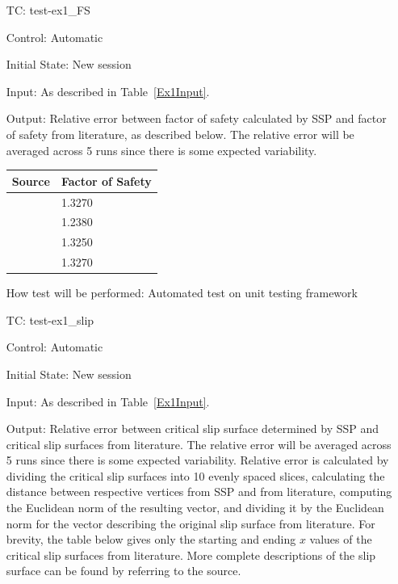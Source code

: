 \documentclass[12pt, titlepage]{article}
\newcounter{testnum} %
\newcommand{\progname}{SSP}
\begin{document}
\begin{enumerate}[label=TC\arabic*:,ref={\arabic*}]
	
\item [TC\refstepcounter{testnum}\thetestnum: \label{TC_Ex1FS}] test-ex1\_FS

Control: Automatic

Initial State: New session

Input: As described in Table~\ref{Ex1Input}.

Output: Relative error between factor of safety calculated by \progname{} and 
factor of safety from literature, as described below. The relative error will 
be averaged across 5 runs since there is some expected variability. \newline
\begin{tabularx}{1.0\textwidth}{p{7cm} l}
	\toprule \textbf{Source} & \textbf{Factor of Safety}\\ \midrule
	\cite{Greco1996} & 1.3270\\
	\cite{MalkawiEtAl} & 1.2380\\
	\cite{ChengEtAl} & 1.3250\\
	\cite{LiEtAl} & 1.3270\\
	\bottomrule
\end{tabularx}

How test will be performed: Automated test on unit testing framework

\item [TC\refstepcounter{testnum}\thetestnum: \label{TC_Ex1Slip}] test-ex1\_slip

Control: Automatic

Initial State: New session

Input: As described in Table~\ref{Ex1Input}.

Output: Relative error between critical slip surface determined by \progname{} 
and critical slip surfaces from literature. The relative error will be averaged 
across 5 runs since there is some expected variability. Relative error is 
calculated by dividing the critical slip surfaces into 10 evenly spaced slices, 
calculating the distance between respective vertices from \progname{} and from 
literature, computing the Euclidean norm of the resulting vector, and dividing 
it by the Euclidean norm for the vector describing the original slip surface 
from literature. For brevity, the table below gives only the starting and 
ending $x$ values of the critical slip surfaces from literature. More complete 
descriptions of the slip surface can be found by referring to the source. 


\end{enumerate}
\end{document}

